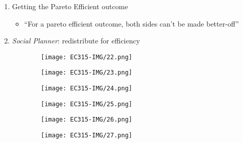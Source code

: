 \documentclass[11pt, english]{article}
\begin{document}
	\begin{enumerate}                               
        \setlength\itemsep{0cm}
		\item Getting the Pareto Efficient outcome
		\begin{itemize}
			\item ``For a pareto efficient outcome, both sides can't be made better-off''
		\end{itemize}
		\item \textit{Social Planner}: redistribute for efficiency 
	\end{enumerate}

	\begin{figure}[H]
        \begin{center}
                \begin{subfigure}[t]{4cm}
                \begin{center}
                        \texttt{[image: EC315-IMG/22.png]}
                \end{center}
                \end{subfigure}
                \begin{subfigure}[t]{4cm}
                \begin{center}
                        \texttt{[image: EC315-IMG/23.png]}
                \end{center}
                \end{subfigure}
                \begin{subfigure}[t]{4cm}
                \begin{center}
                        \texttt{[image: EC315-IMG/24.png]}
                \end{center}
                \end{subfigure}
	\par
                \begin{subfigure}[t]{4cm}
                \begin{center}
                        \texttt{[image: EC315-IMG/25.png]}
		\end{center}
                \end{subfigure}
                \begin{subfigure}[t]{4cm}
                \begin{center}
                        \texttt{[image: EC315-IMG/26.png]}
                \end{center}
                \end{subfigure}
                \begin{subfigure}[t]{4cm}
                \begin{center}
                        \texttt{[image: EC315-IMG/27.png]}
                \end{center}
                \end{subfigure}
        \end{center}
        \end{figure}
\end{document}
